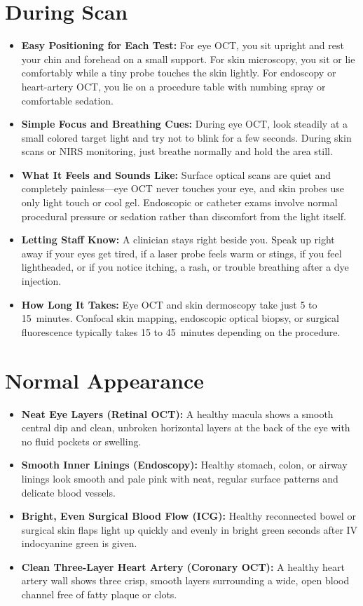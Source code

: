\section{During Scan}
\begin{itemize}
  \item \textbf{Easy Positioning for Each Test:} For eye OCT, you sit upright and rest your chin and forehead on a small support. For skin microscopy, you sit or lie comfortably while a tiny probe touches the skin lightly. For endoscopy or heart-artery OCT, you lie on a procedure table with numbing spray or comfortable sedation.
  \item \textbf{Simple Focus and Breathing Cues:} During eye OCT, look steadily at a small colored target light and try not to blink for a few seconds. During skin scans or NIRS monitoring, just breathe normally and hold the area still.
  \item \textbf{What It Feels and Sounds Like:} Surface optical scans are quiet and completely painless---eye OCT never touches your eye, and skin probes use only light touch or cool gel. Endoscopic or catheter exams involve normal procedural pressure or sedation rather than discomfort from the light itself.
  \item \textbf{Letting Staff Know:} A clinician stays right beside you. Speak up right away if your eyes get tired, if a laser probe feels warm or stings, if you feel lightheaded, or if you notice itching, a rash, or trouble breathing after a dye injection.
  \item \textbf{How Long It Takes:} Eye OCT and skin dermoscopy take just 5 to 15~minutes. Confocal skin mapping, endoscopic optical biopsy, or surgical fluorescence typically takes 15 to 45~minutes depending on the procedure.
\end{itemize}

\section{Normal Appearance}
\begin{itemize}
  \item \textbf{Neat Eye Layers (Retinal OCT):} A healthy macula shows a smooth central dip and clean, unbroken horizontal layers at the back of the eye with no fluid pockets or swelling.
  \item \textbf{Smooth Inner Linings (Endoscopy):} Healthy stomach, colon, or airway linings look smooth and pale pink with neat, regular surface patterns and delicate blood vessels.
  \item \textbf{Bright, Even Surgical Blood Flow (ICG):} Healthy reconnected bowel or surgical skin flaps light up quickly and evenly in bright green seconds after IV indocyanine green is given.
  \item \textbf{Clean Three-Layer Heart Artery (Coronary OCT):} A healthy heart artery wall shows three crisp, smooth layers surrounding a wide, open blood channel free of fatty plaque or clots.
\end{itemize}

